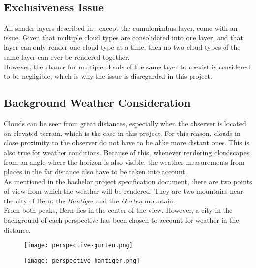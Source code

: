 \subsection{Exclusiveness Issue}
All \gls{shader} layers described in , except the cumulonimbus layer, come with an issue.
Given that multiple cloud types are consolidated into one layer, and that layer can only render one cloud type at a time, then no two cloud types of the same layer can ever be rendered together.
\\
However, the chance for multiple clouds of the same layer to coexist is considered to be negligible, which is why the issue is disregarded in this project.

\pagebreak

\subsection{Background Weather Consideration}
Clouds can be seen from great distances, especially when the observer is located on elevated terrain, which is the case in this project.
For this reason, clouds in close proximity to the observer do not have to be alike more distant ones.
This is also true for weather conditions.
Because of this, whenever rendering cloudscapes from an angle where the horizon is also visible, the weather measurements from places in the far distance also have to be taken into account.
\\
As mentioned in the bachelor project specification document, there are two points of view from which the weather will be rendered.
They are two mountains near the city of Bern: the \emph{Bantiger} and the \emph{Gurten} mountain.
\\
From both peaks, Bern lies in the center of the view. However, a city in the background of each perspective has been chosen to account for weather in the distance.

\begin{figure}[H]
    \centering
        \begin{minipage}{0.47\linewidth}
            \texttt{[image: perspective-gurten.png]}
            \label{img:noise:fbm10_1}
        \end{minipage}
    \hfill
        \begin{minipage}{0.47\linewidth}
            \texttt{[image: perspective-bantiger.png]}
            \label{img:noise:fbm10_2}
        \end{minipage}
\end{figure}

